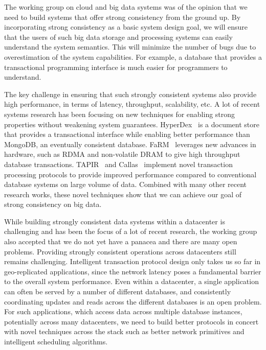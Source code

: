 
The working group on cloud and big data systems was of the opinion that we need
to build systems that offer strong consistency from the ground up.  By
incorporating strong consistency as a basic system design goal, we will ensure
that the users of such big data storage and processing systems can easily
understand the system semantics.  This will minimize the number of bugs due to
overestimation of the system capabilities.  For example, a database that
provides a transactional programming interface is much easier for programmers
to understand.

The key challenge in ensuring that such strongly consistent systems also
provide high performance, in terms of latency, throughput, scalability, etc.  A
lot of recent systems research has been focusing on new techniques for enabling
strong properties without weakening system guarantees.
HyperDex~\cite{HyperDex} is a document store that provides a transactional
interface while enabling better performance than MongoDB, an eventually
consistent database.  FaRM~\cite{farm} leverages new advances in hardware, such
as RDMA and non-volatile DRAM to give high throughput database transactions.
TAPIR~\cite{tapir} and Callas~\cite{callas} implement novel transaction
processing protocols to provide improved performance compared to conventional
database systems on large volume of data.  Combined with many other recent
research works, these novel techniques show that we can achieve our goal of
strong consistency on big data.

While building strongly consistent data systems within a datacenter is
challenging and has been the focus of a lot of recent research, the working
group also accepted that we do not yet have a panacea and there are many open
problems.  Providing strongly consistent operations across datacenters still
remains challenging.  Intelligent transaction protocol design only takes us so
far in geo-replicated applications, since the network latency poses a
fundamental barrier to the overall system performance.  Even within a
datacenter, a single application can often be served by a number of different
databases, and consistently coordinating updates and reads across the different
databases is an open problem.  For such applications, which access data across
multiple database instances, potentially across many datacenters, we need to
build better protocols in concert with novel techniques across the stack such
as better network primitives and intelligent scheduling algorithms.
